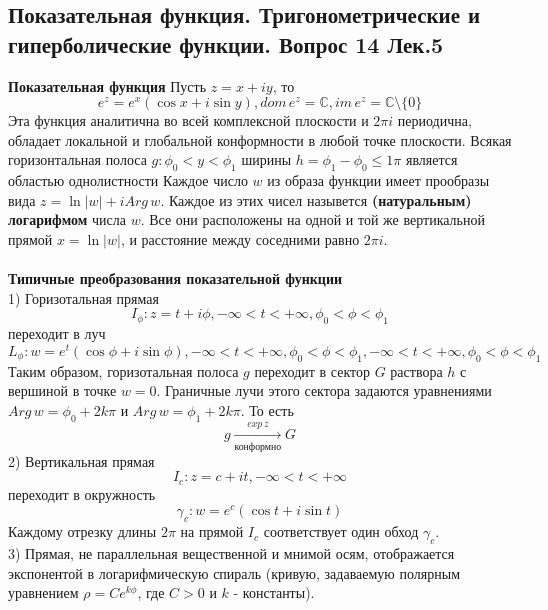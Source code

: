 \documentclass{article}
\begin{document}
\subsection{Показательная функция. Тригонометрические и гиперболические функции. Вопрос 14 Лек.5}
	\textbf{Показательная функция} Пусть $z=x+iy$, то
	\begin{equation}
	{e}^{z}={e}^{x}(\cos x+i\sin y), dom\,{e}^{z}=\mathbb{C},im\,{e}^{z}=\mathbb{C}\setminus \{0\}
	\end{equation}
	Эта функция аналитична во всей комплексной плоскости и $2\pi i$ периодична, обладает локальной и глобальной конформности в любой точке плоскости. Всякая горизонтальная полоса $g:{\phi}_{0}<y<{\phi}_{1}$ ширины $h={\phi}_{1}-{\phi}_{0}\le 1\pi$ является областью однолистности
	Каждое число $w$ из образа функции имеет прообразы вида $z=\ln|w|+iArg\,w$. Каждое из этих чисел назывется \textbf{(натуральным) логарифмом} числа $w$. Все они расположены на одной и той же вертикальной прямой $x=\ln|w|$, и расстояние между соседними равно $2\pi i$.\\
	\\
	\textbf{Типичные преобразования показательной функции}\\
	1) Горизотальная прямая
	\begin{equation}
	{I}_{\phi}:z=t+i\phi,-\infty<t<+\infty,{\phi}_{0}<\phi<{\phi}_{1}
	\end{equation}
	переходит в луч
	\begin{equation}
	{L}_{\phi}:w={e}^{t}(\cos \phi+i\sin \phi),-\infty<t<+\infty,{\phi}_{0}<\phi<{\phi}_{1}, -\infty<t<+\infty,{\phi}_{0}<\phi<{\phi}_{1}
	\end{equation}
	Таким образом, горизотальная полоса $g$ переходит в сектор $G$ раствора $h$ с вершиной в точке $w=0$. Граничные лучи этого сектора задаются уравнениями $Arg\,w={\phi}_{0}+2k\pi$ и $Arg\,w={\phi}_{1}+2k\pi$. То есть
	\begin{equation}
	g\xrightarrow[\text{конформно}]{exp\,z} G
	\end{equation}
	2) Вертикальная прямая
	\begin{equation}
	{I}_{c}:z=c+it,-\infty<t<+\infty
	\end{equation}
	переходит в окружность
	\begin{equation}
	\gamma_{c}:w={e}^{c}(\cos t+i\sin t)
	\end{equation}
	Каждому отрезку длины $2\pi$ на прямой ${I}_{c}$ соответствует один обход $\gamma_{c}$.\\
	3) Прямая, не параллельная вещественной и мнимой осям, отображается экспонентой в логарифмическую спираль (кривую, задаваемую полярным уравнением $ \rho=C e^{k \phi}$, где $ C>0 $ и $ k$ - константы).\\
\end{document}
